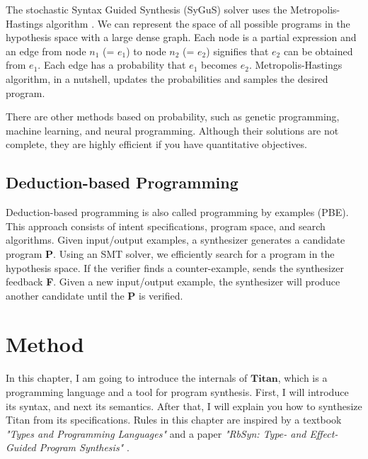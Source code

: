 \documentclass[12pt, a4paper, titlepage]{report}
\begin{document}
    The stochastic Syntax Guided Synthesis (SyGuS) solver uses the Metropolis-Hastings algorithm \cite{alur:2013}.
    We can represent the space of all possible programs in the hypothesis space with a large dense graph.
    Each node is a partial expression and an edge from node $n_1$ (= $e_1$) to node $n_2$ (= $e_2$) signifies that $e_2$ can be obtained from $e_1$.
    Each edge has a probability that $e_1$ becomes $e_2$.
    Metropolis-Hastings algorithm, in a nutshell, updates the probabilities and samples the desired program.

    There are other methods based on probability, such as genetic programming, machine learning, and neural programming.
    Although their solutions are not complete, they are highly efficient if you have quantitative objectives.

  \section{Deduction-based Programming}
    Deduction-based programming is also called programming by examples (PBE).
    This approach consists of intent specifications, program space, and search algorithms.
    Given input/output examples, a synthesizer generates a candidate program \textbf{P}.
    Using an SMT solver, we efficiently search for a program in the hypothesis space.
    If the verifier finds a counter-example, sends the synthesizer feedback \textbf{F}.
    Given a new input/output example, the synthesizer will produce another candidate until the \textbf{P} is verified.



\chapter{Method}\label{chapter:method}
  In this chapter, I am going to introduce the internals of $\mathbf{Titan}$, which is a programming language and a tool for program synthesis.
  First, I will introduce its syntax, and next its semantics.
  After that, I will explain you how to synthesize Titan from its specifications.
  Rules in this chapter are inspired by a textbook \emph{"Types and Programming Languages"} \cite{pierce:2002} and a paper \emph{"RbSyn: Type- and Effect-Guided Program Synthesis"} \cite{guria:2021}.
\end{document}
